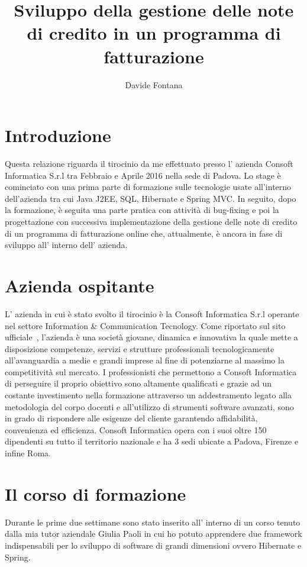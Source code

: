 \documentclass[12pt]{book}
\title{Sviluppo della gestione delle note di credito in un programma di fatturazione}
\author{Davide Fontana}
\date{}
\begin{document}
\maketitle
\tableofcontents
\chapter{Introduzione}
Questa relazione riguarda il tirocinio da me effettuato presso l' azienda 
Consoft Informatica S.r.l tra Febbraio e Aprile 2016 nella sede di Padova.
Lo stage è cominciato con una prima parte di formazione sulle tecnologie usate 
all'interno dell'azienda tra cui Java J2EE, SQL, Hibernate e Spring MVC\@.
In seguito, dopo la formazione, è seguita una parte pratica con attività di 
bug-fixing e poi la progettazione con successiva implementazione della gestione 
delle note di credito di un programma di fatturazione online che, attualmente,
è ancora in fase di sviluppo all' interno dell' azienda. 
\chapter{Azienda ospitante}
L' azienda in cui è stato svolto il tirocinio è la Consoft Informatica S.r.l
operante nel settore Information \& Communication Tecnology\@.
Come riportato sul sito ufficiale~\cite{consoft:descrizione}, l'azienda è una
società giovane, dinamica e innovativa la quale mette a disposizione competenze,
servizi e strutture professionali tecnologicamente all’avanguardia a medie e 
grandi imprese al fine di potenziarne al massimo la competitività sul mercato. 
I professionisti che permettono a Consoft Informatica di perseguire il 
proprio obiettivo sono altamente qualificati e grazie ad un costante 
investimento nella formazione attraverso un  addestramento legato alla 
metodologia del corpo docenti e all’utilizzo di strumenti software avanzati, 
sono in grado di rispondere alle esigenze del cliente garantendo affidabilità,
convenienza ed efficienza.
Consoft Informatica opera con i suoi oltre 150 dipendenti su tutto il territorio
nazionale e ha 3 sedi ubicate a Padova, Firenze e infine Roma. 
\chapter{Il corso di formazione}
Durante le prime due settimane sono stato inserito all’ interno di un corso 
tenuto dalla mia tutor aziendale Giulia Paoli in cui ho potuto apprendere 
due framework indispensabili per lo sviluppo di software di grandi dimensioni 
ovvero Hibernate e Spring.
\end{document}
